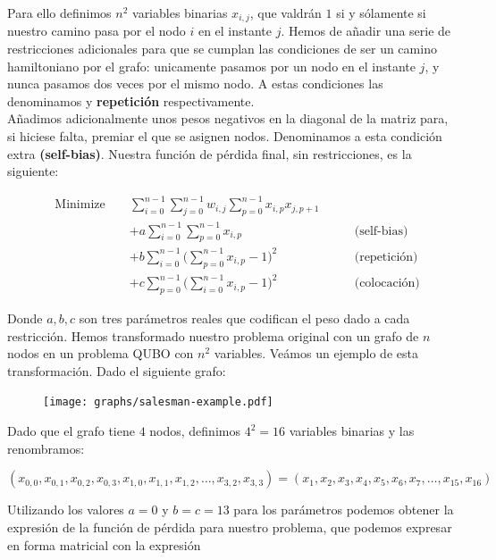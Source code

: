 \documentclass[11pt]{article}
\begin{document}
Para ello definimos $n^2$ variables binarias $x_{i,j}$, que valdrán $1$ si y sólamente si nuestro camino pasa por el nodo $i$ en el instante $j$. Hemos de añadir una serie de restricciones adicionales para que se cumplan las condiciones de ser un camino hamiltoniano por el grafo: unicamente pasamos por un nodo en el instante $j$, y nunca pasamos dos veces por el mismo nodo. A estas condiciones las denominamos  y \textbf{repetición} respectivamente. \\

Añadimos adicionalmente unos pesos negativos en la diagonal de la matriz para, si hiciese falta, premiar el que se asignen nodos. Denominamos a esta condición extra \textbf{(self-bias)}. Nuestra función de pérdida final, sin restricciones, es la siguiente:

\begin{equation}
	\begin{alignedat}{3}
		& \text{Minimize }	&& \sum_{i=0}^{n-1} \sum_{j=0}^{n-1} w_{i,j}\sum_{p=0}^{n-1} x_{i,p}x_{j,p+1} & \\
		& && + a \sum_{i=0}^{n-1} \sum_{p=0}^{n-1} x_{i,p} & \qquad \text{(self-bias)} \\
		& && + b \sum_{i=0}^{n-1} \Big( \sum_{p=0}^{n-1} x_{i,p} - 1 \Big)^2 & \qquad \text{(repetición)} \\
		& && + c \sum_{p=0}^{n-1} \Big( \sum_{i=0}^{n-1} x_{i,p} - 1 \Big)^2 & \qquad \text{(colocación)}
	\end{alignedat}
\end{equation}

Donde $a,b,c$ son tres parámetros reales que codifican el peso dado a cada restricción. Hemos transformado nuestro problema original con un grafo de $n$ nodos en un problema QUBO con $n^2$ variables. Veámos un ejemplo de esta transformación. Dado el siguiente grafo:

\begin{figure}[H]
	\texttt{[image: graphs/salesman-example.pdf]}
	\centering
\end{figure}

Dado que el grafo tiene $4$ nodos, definimos $4^2 = 16$ variables binarias y las renombramos:

\[ (x_{0,0}, x_{0,1}, x_{0,2}, x_{0,3}, x_{1,0}, x_{1,1}, x_{1,2}, \dots, x_{3,2}, x_{3,3}) =
(x_1, x_2, x_3, x_4, x_5, x_6, x_7, \dots, x_{15}, x_{16}) \]

Utilizando los valores $a = 0$ y $b = c = 13$ para los parámetros podemos obtener la expresión de la función de pérdida para nuestro problema, que podemos expresar en forma matricial con la expresión 
\end{document}
